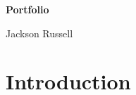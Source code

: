 \documentclass{article}
\begin{document}
\begin{titlepage}
    \centering
    \vspace*{2cm}
    {\Huge\bfseries Portfolio \par}
    \vspace{2cm}
    {\Large Jackson Russell \par}
    \vfill
\end{titlepage}

\tableofcontents
\newpage


\section*{Introduction}



\end{document}
